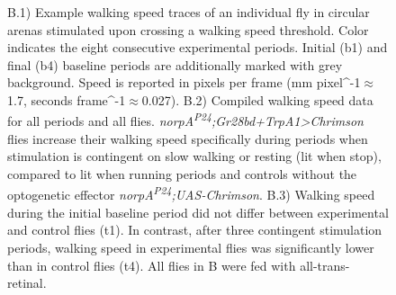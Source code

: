 \documentclass[10pt]{article}
\begin{document}
\begin{figure}[t!]
{	B.1) Example walking speed traces of an individual fly in circular arenas stimulated upon crossing a walking speed threshold. Color  indicates the eight consecutive experimental periods. Initial (b1) and final (b4) baseline periods are additionally marked with grey background. Speed is reported in pixels per frame (mm pixel^{-1}$\approx$1.7, seconds frame^{-1}$\approx$0.027).
	B.2) Compiled walking speed data for all periods and all flies. \textit{norpA\textsuperscript{P24};Gr28bd+TrpA1>Chrimson} flies increase their walking speed specifically during periods when stimulation is contingent on slow walking or resting (lit when stop), compared to lit when running periods and controls without the optogenetic effector \textit{norpA\textsuperscript{P24};UAS-Chrimson}.
	B.3) Walking speed during the initial baseline period did not differ between experimental and control flies (t1). In contrast, after three contingent stimulation periods, walking speed in experimental flies was significantly lower than in control flies (t4). 
	All flies in B were fed with all-trans-retinal.} 
\end{figure}
\end{document}
